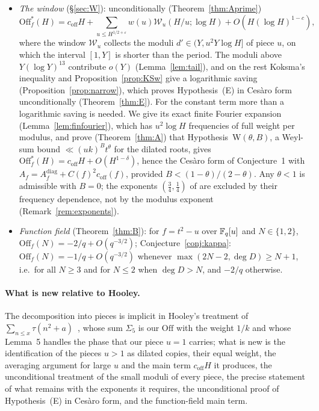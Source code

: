 \documentclass[11pt,a4paper]{article}
\theoremstyle{remark}\newtheorem{remark}[theorem]{Remark}
\newcommand{\Off}{\mathrm{Off}}\newcommand{\e}{\mathrm{e}}
\begin{document}
\begin{itemize}
\item \emph{The window} (\S\ref{sec:W}): unconditionally (Theorem~\ref{thm:Aprime})
\[
\Off^\ast_f(H)=c_{\mathrm{off}}H+\sum_{u\le H^{1/2+\varepsilon}}w(u)\mathcal W_u(H/u;\log H)+O(H(\log H)^{1-c}),
\]
where the
window $\mathcal W_u$ collects the moduli $d'\in(Y,u^2Y\log H]$ of piece $u$, on which the interval $[1,Y]$ is shorter
than the period. The moduli above $Y(\log Y)^{13}$ contribute $o(Y)$ (Lemma~\ref{lem:tail}), and on the rest Koksma's
inequality and Proposition~\ref{prop:KSw} give a logarithmic saving (Proposition~\ref{prop:narrow}), which proves
Hypothesis~(E) in Ces\`aro form unconditionally (Theorem~\ref{thm:E}). For the constant term more than a logarithmic saving is needed. We give its
exact finite Fourier expansion (Lemma~\ref{lem:finfourier}), which has $u^2\log H$ frequencies of full weight per
modulus, and prove (Theorem~\ref{thm:A}) that Hypothesis~W$(\theta,B)$, a Weyl-sum bound $\ll(uk)^Bt^{\theta}$ for the
dilated roots, gives $\Off^\ast_f(H)=c_{\mathrm{off}}H+O(H^{1-\delta})$, hence the Ces\`aro form of Conjecture~1 with
$A_f=A^{\mathrm{diag}}_f+C(f)^2c_{\mathrm{off}}(f)$, provided $B<(1-\theta)/(2-\theta)$. Any $\theta<1$ is admissible with $B=0$; the
exponents $(\tfrac34,\tfrac14)$ of \cite{DFI2012} are excluded by their frequency dependence, not by the modulus exponent
(Remark~\ref{rem:exponents}).
\item \emph{Function field} (Theorem~\ref{thm:B}): for $f=t^2-u$ over $\mathbb{F}_q[u]$ and $N\in\{1,2\}$,
$\Off_f(N)=-2/q+O(q^{-3/2})$; Conjecture~\ref{conj:kappa}: $\Off_f(N)=-1/q+O(q^{-3/2})$ whenever
$\max(2N-2,\deg D)\ge N+1$, i.e.\ for all $N\ge3$ and for $N\le2$ when $\deg D>N$, and $-2/q$ otherwise.
\end{itemize}

\paragraph{What is new relative to Hooley.} The decomposition into pieces is implicit in Hooley's treatment of
$\sum_{n\le x}\tau(n^2+a)$~\cite{Hooley1963}, whose sum $\Sigma_5$ is our $\Off$ with the weight $1/k$ and
whose Lemma~5 handles the phase that our piece $u=1$ carries; what is new is the identification of the pieces
$u>1$ as dilated copies, their equal weight, the averaging argument for large $u$ and the main term
$c_{\mathrm{off}}H$ it produces, the unconditional treatment of the small moduli of every piece, the precise statement
of what remains with the exponents it requires, the unconditional proof of Hypothesis~(E) in Ces\`aro form, and the
function-field main term.
\end{document}
